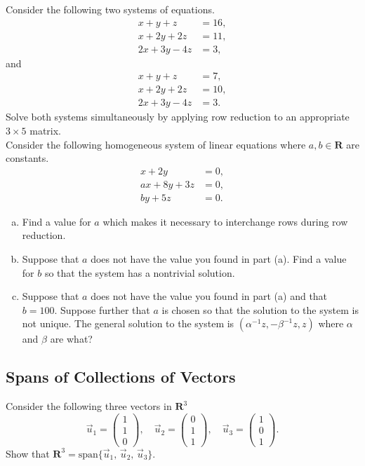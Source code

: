 \documentclass[a4paper,11pt]{article}
\newcommand{\R}{\mathbf{R}}
\begin{document}
 Consider the following two systems of
equations.
\begin{align*}
  x+y+z &= 16, \\
  x+2y+2z &= 11, \\
  2x+3y-4z &= 3,
\end{align*}
and
\begin{align*}
  x+y+z &= 7, \\
  x+2y+2z &= 10, \\
  2x+3y-4z &= 3.
\end{align*}
Solve both systems simultaneously by applying row reduction to an appropriate $3
\times 5$ matrix. \\

 Consider the following homogeneous system of
linear equations where $a,b \in \R$ are constants.
\begin{align*}
  x+2y &= 0, \\
  ax+8y+3z &= 0, \\
  by+5z &= 0.
\end{align*}
\begin{enumerate}[(a)]
\item Find a value for $a$ which makes it necessary to interchange rows during
  row reduction.
\item Suppose that $a$ does not have the value you found in part (a). Find a
  value for $b$ so that the system has a nontrivial solution.
\item Suppose that $a$ does not have the value you found in part (a) and that
  $b=100$. Suppose further that $a$ is chosen so that the solution to the system
  is not unique. The general solution to the system is
  $(\alpha^{-1}z,-\beta^{-1}z,z)$ where $\alpha$ and $\beta$ are what? \\
\end{enumerate}

\subsection*{Spans of Collections of Vectors}

 Consider the following three vectors in $\R^3$
\[
  \vec u_1 = \begin{pmatrix}1\\1\\0\end{pmatrix},\quad
  \vec u_2 = \begin{pmatrix}0\\1\\1\end{pmatrix},\quad
  \vec u_3 = \begin{pmatrix}1\\0\\1\end{pmatrix}.
\]
Show that $\R^3=\text{span}\{\vec u_1,\,\vec u_2,\,\vec u_3\}$. \\
\end{document}
